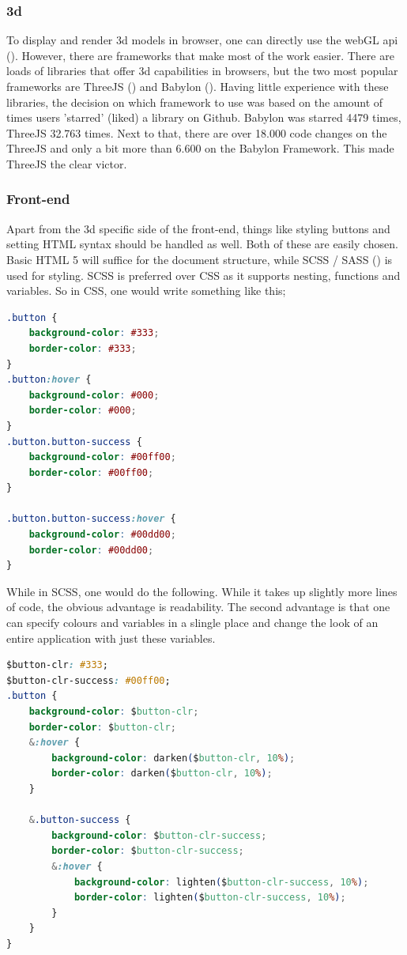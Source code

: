 \subsubsection{3d}
\label{subsub: 3d}
To display and render 3d models in browser, one can directly use the webGL api (\cite{webGL}). However, there are frameworks that make most of the work easier. There are loads of libraries that offer 3d capabilities in browsers, but the two most popular frameworks are ThreeJS (\cite{threejs}) and Babylon (\cite{babylon}). Having little experience with these libraries, the decision on which framework to use was based on the amount of times users 'starred' (liked) a library on Github. Babylon was starred 4479 times, ThreeJS 32.763 times. Next to that, there are over 18.000 code changes on the ThreeJS and only a bit more than 6.600 on the Babylon Framework. This made ThreeJS the clear victor.

\subsubsection{Front-end}
\label{subsub: frontEnd}
Apart from the 3d specific side of the front-end, things like styling buttons and setting HTML syntax should be handled as well. Both of these are easily chosen. Basic HTML 5 will suffice for the document structure, while SCSS / SASS (\cite{scss}) is used for styling. SCSS is preferred over CSS as it supports nesting, functions and variables. So in CSS, one would write something like this;

\begin{lstlisting}[language=CSS]
.button {
	background-color: #333;
	border-color: #333;
}
.button:hover {
	background-color: #000;
	border-color: #000;
}
.button.button-success {
	background-color: #00ff00;
	border-color: #00ff00;
}

.button.button-success:hover {
	background-color: #00dd00;
	border-color: #00dd00;
}
\end{lstlisting}

\clearpage
While in SCSS, one would do the following. While it takes up slightly more lines of code, the obvious advantage is readability. The second advantage is that one can specify colours and variables in a slingle place and change the look of an entire application with just these variables.

\begin{lstlisting}[language=CSS]
$button-clr: #333;
$button-clr-success: #00ff00;
.button {
	background-color: $button-clr;
	border-color: $button-clr;
	&:hover {
		background-color: darken($button-clr, 10%);
		border-color: darken($button-clr, 10%);
	}
	
	&.button-success {
		background-color: $button-clr-success;
		border-color: $button-clr-success;
		&:hover {
			background-color: lighten($button-clr-success, 10%);
			border-color: lighten($button-clr-success, 10%);
		}
	}
}
\end{lstlisting}

